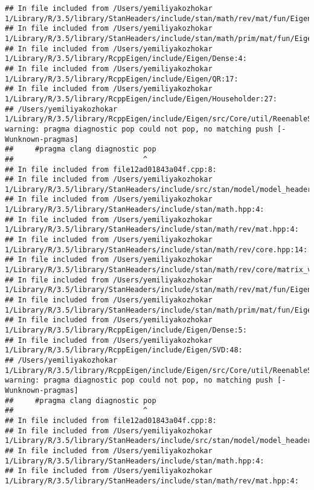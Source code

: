 \documentclass[]{article}
\begin{document}
\begin{verbatim}
## In file included from /Users/yemiliyakozhokar 1/Library/R/3.5/library/StanHeaders/include/stan/math/rev/mat/fun/Eigen_NumTraits.hpp:4:
## In file included from /Users/yemiliyakozhokar 1/Library/R/3.5/library/StanHeaders/include/stan/math/prim/mat/fun/Eigen.hpp:4:
## In file included from /Users/yemiliyakozhokar 1/Library/R/3.5/library/RcppEigen/include/Eigen/Dense:4:
## In file included from /Users/yemiliyakozhokar 1/Library/R/3.5/library/RcppEigen/include/Eigen/QR:17:
## In file included from /Users/yemiliyakozhokar 1/Library/R/3.5/library/RcppEigen/include/Eigen/Householder:27:
## /Users/yemiliyakozhokar 1/Library/R/3.5/library/RcppEigen/include/Eigen/src/Core/util/ReenableStupidWarnings.h:10:30: warning: pragma diagnostic pop could not pop, no matching push [-Wunknown-pragmas]
##     #pragma clang diagnostic pop
##                              ^
## In file included from file12ad01843a04f.cpp:8:
## In file included from /Users/yemiliyakozhokar 1/Library/R/3.5/library/StanHeaders/include/src/stan/model/model_header.hpp:4:
## In file included from /Users/yemiliyakozhokar 1/Library/R/3.5/library/StanHeaders/include/stan/math.hpp:4:
## In file included from /Users/yemiliyakozhokar 1/Library/R/3.5/library/StanHeaders/include/stan/math/rev/mat.hpp:4:
## In file included from /Users/yemiliyakozhokar 1/Library/R/3.5/library/StanHeaders/include/stan/math/rev/core.hpp:14:
## In file included from /Users/yemiliyakozhokar 1/Library/R/3.5/library/StanHeaders/include/stan/math/rev/core/matrix_vari.hpp:4:
## In file included from /Users/yemiliyakozhokar 1/Library/R/3.5/library/StanHeaders/include/stan/math/rev/mat/fun/Eigen_NumTraits.hpp:4:
## In file included from /Users/yemiliyakozhokar 1/Library/R/3.5/library/StanHeaders/include/stan/math/prim/mat/fun/Eigen.hpp:4:
## In file included from /Users/yemiliyakozhokar 1/Library/R/3.5/library/RcppEigen/include/Eigen/Dense:5:
## In file included from /Users/yemiliyakozhokar 1/Library/R/3.5/library/RcppEigen/include/Eigen/SVD:48:
## /Users/yemiliyakozhokar 1/Library/R/3.5/library/RcppEigen/include/Eigen/src/Core/util/ReenableStupidWarnings.h:10:30: warning: pragma diagnostic pop could not pop, no matching push [-Wunknown-pragmas]
##     #pragma clang diagnostic pop
##                              ^
## In file included from file12ad01843a04f.cpp:8:
## In file included from /Users/yemiliyakozhokar 1/Library/R/3.5/library/StanHeaders/include/src/stan/model/model_header.hpp:4:
## In file included from /Users/yemiliyakozhokar 1/Library/R/3.5/library/StanHeaders/include/stan/math.hpp:4:
## In file included from /Users/yemiliyakozhokar 1/Library/R/3.5/library/StanHeaders/include/stan/math/rev/mat.hpp:4:

\end{verbatim}
\end{document}

